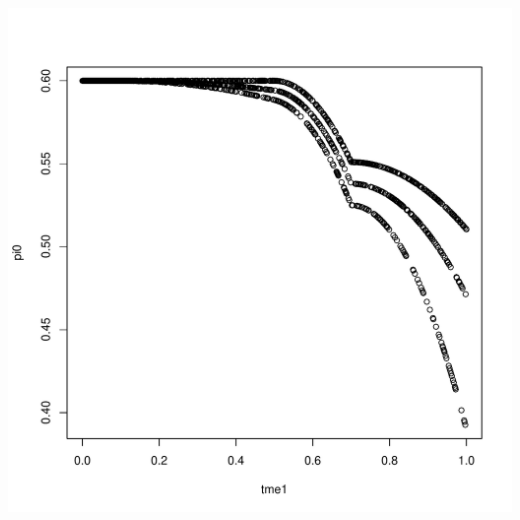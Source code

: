 \documentclass{article}\usepackage[]{graphicx}\usepackage[]{color}
\makeatletter
\def\maxwidth{ %
  \ifdim\Gin@nat@width>\linewidth
    \linewidth
  \else
    \Gin@nat@width
  \fi
}
\newenvironment{knitrout}{}{} %
\makeatother
\begin{document}
\begin{knitrout}
{\centering \includegraphics[width=\maxwidth]{Figures/IV-1} 

}



\end{knitrout}
\end{document}
